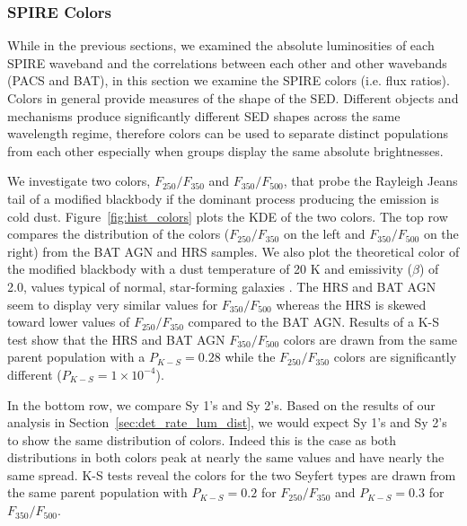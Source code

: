 \subsubsection{SPIRE Colors}
While in the previous sections, we examined the absolute luminosities of each SPIRE waveband and the correlations between each other and other wavebands (PACS and BAT), in this section we examine the SPIRE colors (i.e. flux ratios). Colors in general provide measures of the shape of the SED. Different objects and mechanisms produce significantly different SED shapes across the same wavelength regime, therefore colors can be used to separate distinct populations from each other especially when groups display the same absolute brightnesses.

We investigate two colors, $F_{250}/F_{350}$ and $F_{350}/F_{500}$, that probe the Rayleigh Jeans tail of a modified blackbody if the dominant process producing the emission is cold dust. Figure~\ref{fig:hist_colors} plots the KDE of the two colors. The top row compares the distribution of the colors ($F_{250}/F_{350}$ on the left and $F_{350}/F_{500}$ on the right) from the BAT AGN and HRS samples. We also plot the theoretical color of the modified blackbody with a dust temperature of 20 K and emissivity ($\beta$) of 2.0, values typical of normal, star-forming galaxies \citep[e.g.][]{Calzetti:2000fk, Smith:2012fj, Galametz:2012uq, Dale:2012dq, Cortese:2014qq}. The HRS and BAT AGN seem to display very similar values for $F_{350}/F_{500}$ whereas the HRS is skewed toward lower values of $F_{250}/F_{350}$ compared to the BAT AGN. Results of a K-S test show that the HRS and BAT AGN $F_{350}/F_{500}$ colors are drawn from the same parent population with a $P_{K-S} = 0.28$ while the $F_{250}/F_{350}$ colors are significantly different ($P_{K-S} = 1 \times 10^{-4}$). 

In the bottom row, we compare Sy 1's and Sy 2's. Based on the results of our analysis in Section~\ref{sec:det_rate_lum_dist}, we would expect Sy 1's and Sy 2's to show the same distribution of colors. Indeed this is the case as both distributions in both colors peak at nearly the same values and have nearly the same spread. K-S tests reveal the colors for the two Seyfert types are drawn from the same parent population with $P_{K-S} = 0.2$ for $F_{250}/F_{350}$ and $P_{K-S} = 0.3$ for $F_{350}/F_{500}$.
  